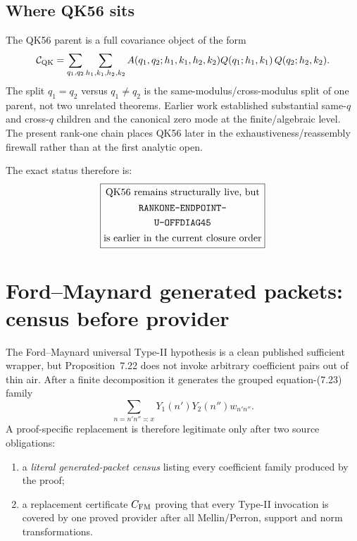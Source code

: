 \documentclass[11pt]{article}
\theoremstyle{definition}
\newcommand{\1}{\mathbf 1}
\begin{document}
{{{\subsection{Where QK56 sits}

The QK56 parent is a full covariance object of the form
\[
\mathcal C_{\rm QK}
=
\sum_{q_1,q_2}
\sum_{h_1,k_1,h_2,k_2}
A(q_1,q_2;h_1,k_1,h_2,k_2)
Q(q_1;h_1,k_1)\,Q(q_2;h_2,k_2).
\]
The split $q_1=q_2$ versus $q_1\ne q_2$ is the same-modulus/cross-modulus split of one
parent, not two unrelated theorems.  Earlier work established substantial same-$q$ and
cross-$q$ children and the canonical zero mode at the finite/algebraic level.  The present
rank-one chain places QK56 later in the exhaustiveness/reassembly firewall rather than at
the first analytic open.

The exact status therefore is:
\[
\boxed{
\begin{gathered}
\text{QK56 remains structurally live, but}\\
\begin{gathered}\text{\ttfamily RANKONE-ENDPOINT-}\\\text{\ttfamily U-OFFDIAG45}\end{gathered}\\
\text{is earlier in the current closure order}
\end{gathered}}
\]

\section{Ford--Maynard generated packets: census before provider}
\label{sec:ford-census}

The Ford--Maynard universal Type-II hypothesis is a clean published sufficient wrapper,
but Proposition~7.22 does not invoke arbitrary coefficient pairs out of thin air.  After a
finite decomposition it generates the grouped equation-(7.23) family
\[
\sum_{n=n'n''\asymp x}Y_1(n')Y_2(n'')w_{n'n''}.
\]
A proof-specific replacement is therefore legitimate only after two source obligations:
\begin{enumerate}[leftmargin=1.7em]
\item a \emph{literal generated-packet census} listing every coefficient family produced by
  the proof;
\item a replacement certificate $C_{\rm FM}$ proving that every Type-II invocation is
  covered by one proved provider after all Mellin/Perron, support and norm transformations.
\end{enumerate}

}}}
\end{document}
